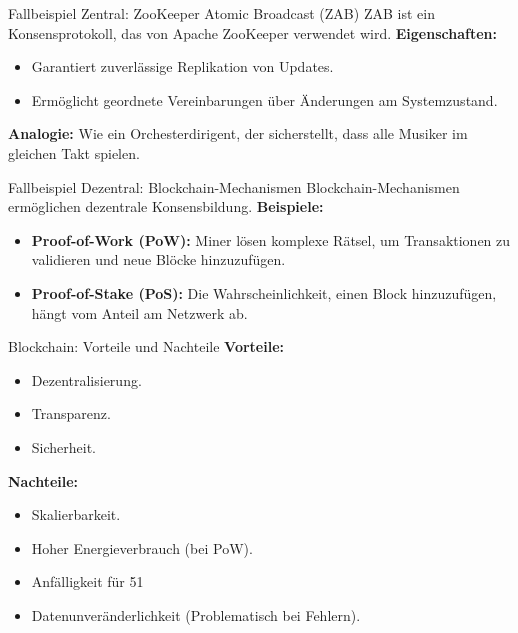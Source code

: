 \documentclass{beamer}
\begin{document}
\begin{frame}{Fallbeispiel Zentral: ZooKeeper Atomic Broadcast (ZAB)}
    ZAB ist ein Konsensprotokoll, das von Apache ZooKeeper verwendet wird. \newline
    \textbf{Eigenschaften:}
    \begin{itemize}
        \item Garantiert zuverlässige Replikation von Updates.
        \item Ermöglicht geordnete Vereinbarungen über Änderungen am Systemzustand.
    \end{itemize}
    \textbf{Analogie:} Wie ein Orchesterdirigent, der sicherstellt, dass alle Musiker im gleichen Takt spielen.
\end{frame}

\begin{frame}{Fallbeispiel Dezentral: Blockchain-Mechanismen}
    Blockchain-Mechanismen ermöglichen dezentrale Konsensbildung. \newline
    \textbf{Beispiele:}
    \begin{itemize}
        \item \textbf{Proof-of-Work (PoW):} Miner lösen komplexe Rätsel, um Transaktionen zu validieren und neue Blöcke hinzuzufügen.
        \item \textbf{Proof-of-Stake (PoS):} Die Wahrscheinlichkeit, einen Block hinzuzufügen, hängt vom Anteil am Netzwerk ab.
    \end{itemize}
\end{frame}

\begin{frame}{Blockchain: Vorteile und Nachteile}
    \textbf{Vorteile:}
    \begin{itemize}
        \item Dezentralisierung.
        \item Transparenz.
        \item Sicherheit.
    \end{itemize}
    \textbf{Nachteile:}
    \begin{itemize}
        \item Skalierbarkeit.
        \item Hoher Energieverbrauch (bei PoW).
        \item Anfälligkeit für 51%
        \item Datenunveränderlichkeit (Problematisch bei Fehlern).
    \end{itemize}
\end{frame}
\end{document}
